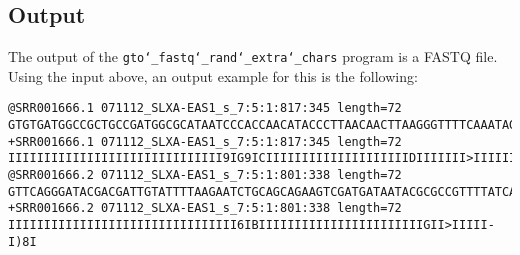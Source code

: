 \subsection*{Output}
The output of the \texttt{gto\char`_fastq\char`_rand\char`_extra\char`_chars} program is a FASTQ file.\\
Using the input above, an output example for this is the following:
\begin{lstlisting}
@SRR001666.1 071112_SLXA-EAS1_s_7:5:1:817:345 length=72
GTGTGATGGCCGCTGCCGATGGCGCATAATCCCACCAACATACCCTTAACAACTTAAGGGTTTTCAAATAGA
+SRR001666.1 071112_SLXA-EAS1_s_7:5:1:817:345 length=72
IIIIIIIIIIIIIIIIIIIIIIIIIIIIII9IG9ICIIIIIIIIIIIIIIIIIIIIDIIIIIII>IIIIII/
@SRR001666.2 071112_SLXA-EAS1_s_7:5:1:801:338 length=72
GTTCAGGGATACGACGATTGTATTTTAAGAATCTGCAGCAGAAGTCGATGATAATACGCGCCGTTTTATCAG
+SRR001666.2 071112_SLXA-EAS1_s_7:5:1:801:338 length=72
IIIIIIIIIIIIIIIIIIIIIIIIIIIIIIII6IBIIIIIIIIIIIIIIIIIIIIIIIGII>IIIII-I)8I
\end{lstlisting}
